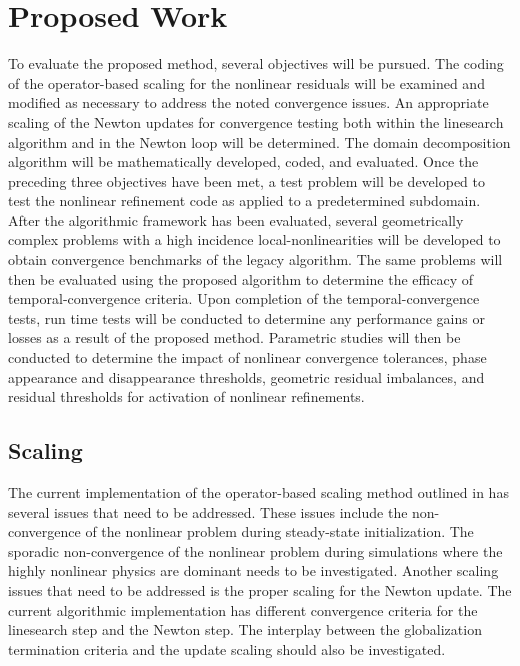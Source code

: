 \chapter{Proposed Work}
\label{chap:proposal}
To evaluate the proposed method, several objectives will be pursued.
The coding of the operator-based scaling for the nonlinear residuals will be examined and modified as necessary to address the noted convergence issues.
An appropriate scaling of the Newton updates for convergence testing both within the linesearch algorithm and in the Newton loop will be determined.
The domain decomposition algorithm will be mathematically developed, coded, and evaluated.
Once the preceding three objectives have been met, a test problem will be developed to test the nonlinear refinement code as applied to a predetermined subdomain.
After the algorithmic framework has been evaluated, several geometrically complex problems with a high incidence local-nonlinearities will be developed to obtain convergence benchmarks of the legacy algorithm.
The same problems will then be evaluated using the proposed algorithm to determine the efficacy of temporal-convergence criteria.
Upon completion of the temporal-convergence tests, run time tests will be conducted to determine any performance gains or losses as a result of the proposed method.
Parametric studies will then be conducted to determine the impact of nonlinear convergence tolerances, phase appearance and disappearance thresholds, geometric residual imbalances, and residual thresholds for activation of nonlinear refinements.

\section{Scaling}
\label{sect:proposal_scaling}
The current implementation of the operator-based scaling method outlined in  has several issues that need to be addressed.
These issues include the non-convergence of the nonlinear problem during steady-state initialization.
The sporadic non-convergence of the nonlinear problem during simulations where the highly nonlinear physics are dominant needs to be investigated.
Another scaling issues that need to be addressed is the proper scaling for the Newton update.
The current algorithmic implementation has different convergence criteria for the linesearch step and the Newton step.
The interplay between the globalization termination criteria and the update scaling should also be investigated. 

